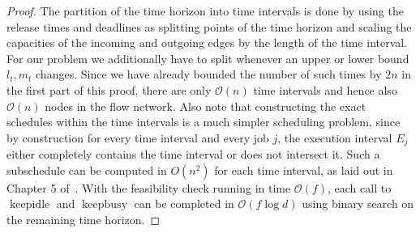 \documentclass[a4paper]{article}
\DeclareMathOperator{\keepidle}{keepidle}
\DeclareMathOperator{\keepbusy}{keepbusy}
\begin{document}
\begin{proof}
  The partition of the time horizon into time intervals is done by using the release times and deadlines as splitting points of the time horizon and scaling the capacities of the incoming and outgoing edges by the length of the time interval.
  For our problem we additionally have to split whenever an upper or lower bound $l_t, m_t$ changes.
  Since we have already bounded the number of such times by $2n$ in the first part of this proof, there are only $\mathcal{O}(n)$ time intervals and hence also $\mathcal{O}(n)$ nodes in the flow network.
  Also note that constructing the exact schedules within the time intervals is a much simpler scheduling problem, since by construction for every time interval and every job $j$, the execution interval $E_j$ either completely contains the time interval or does not intersect it.
  Such a subschedule can be computed in $O(n^2)$ for each time interval, as laid out in Chapter 5 of~\cite{brucker_scheduling_algorithms}.
  With the feasibility check running in time $\mathcal{O}(f)$, each call to $\keepidle$ and $\keepbusy$ can be completed in $\mathcal{O}(f \log d)$ using binary search on the remaining time horizon.
\end{proof}

%


\end{document}
